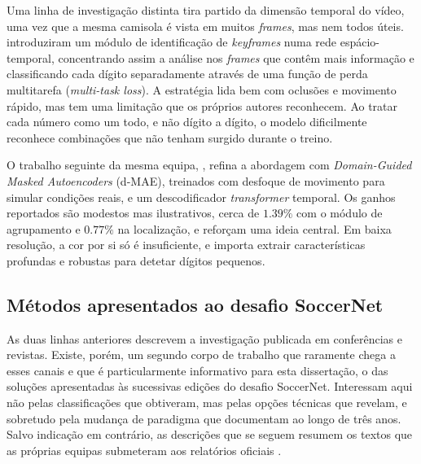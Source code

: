 Uma linha de investigação distinta tira partido da dimensão temporal do vídeo, uma vez que
a mesma camisola é vista em muitos \emph{frames}, mas nem todos úteis.
\citet{balaji2023jersey} introduziram um módulo de identificação de \emph{keyframes} numa
rede espácio-temporal, concentrando assim a análise nos \emph{frames} que contêm mais
informação e classificando cada dígito separadamente através de uma função de perda
multitarefa (\emph{multi-task loss}). A estratégia lida bem com oclusões e movimento
rápido, mas tem uma limitação que os próprios autores reconhecem. Ao tratar cada número
como um todo, e não dígito a dígito, o modelo dificilmente reconhece combinações que não
tenham surgido durante o treino.

O trabalho seguinte da mesma equipa, \citet{balaji2024dmae}, refina a abordagem com
\emph{Domain-Guided Masked Autoencoders} (d-MAE), treinados com desfoque de movimento
para simular condições reais, e um descodificador \emph{transformer} temporal. Os ganhos
reportados são modestos mas ilustrativos, cerca de $1{.}39\%$ com o módulo de agrupamento
e $0{.}77\%$ na localização, e reforçam uma ideia central. Em baixa resolução, a cor por
si só é insuficiente, e importa extrair características profundas e robustas para detetar
dígitos pequenos.

\subsection{Métodos apresentados ao desafio SoccerNet}\label{sec:jnr-desafio}

As duas linhas anteriores descrevem a investigação publicada em conferências e revistas.
Existe, porém, um segundo corpo de trabalho que raramente chega a esses canais e que é
particularmente informativo para esta dissertação, o das soluções apresentadas às
sucessivas edições do desafio SoccerNet. Interessam aqui não pelas classificações que
obtiveram, mas pelas opções técnicas que revelam, e sobretudo pela mudança de paradigma
que documentam ao longo de três anos. Salvo indicação em contrário, as descrições que se
seguem resumem os textos que as próprias equipas submeteram aos relatórios oficiais
\citep{cioppa2023soccernet, cioppa2024soccernet, giancola2025soccernet}.

